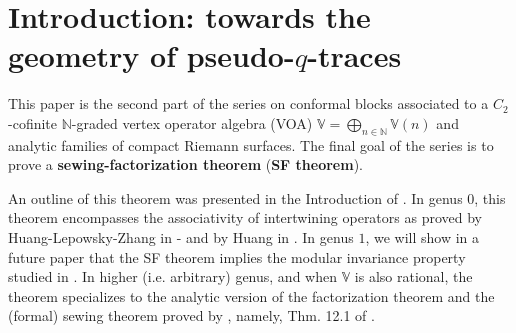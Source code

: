 \documentclass[11pt,b5paper,notitlepage]{article}
\theoremstyle{definition}
\theoremstyle{plain}
\newcommand{\Vbb}{\mathbb V}
\newcommand{\Nbb}{\mathbb N}
\newcommand{\<}{\left\langle}
\renewcommand{\>}{\right\rangle}
\numberwithin{equation}{section}
\begin{document}



	
	
	
	

	
	

	
	
	
	
	
	
	
	
	



\section{Introduction: towards the geometry of pseudo-$q$-traces}

\nocite{HLZ1,HLZ2,HLZ3,HLZ4,HLZ5,HLZ6,HLZ7,HLZ8}



This paper is the second part of the series on conformal blocks associated to a $C_2$-cofinite $\Nbb$-graded vertex operator algebra (VOA) $\Vbb=\bigoplus_{n\in\Nbb}\Vbb(n)$ and analytic families of compact Riemann surfaces. The final goal of the series is to prove a \textbf{sewing-factorization theorem} (\textbf{SF theorem}). 

An outline of this theorem was presented in the Introduction of \cite{GZ1}. In genus $0$, this theorem encompasses the associativity of intertwining operators as proved by Huang-Lepowsky-Zhang in \cite{HLZ1,HLZ2}-\cite{HLZ8} and by Huang in \cite{Hua-projectivecover}. In genus $1$, we will show in a future paper that the SF theorem implies the modular invariance property studied in \cite{Zhu-modular-invariance,Miy-modular-invariance,Hua-differential-genus-1,AN-pseudo-trace,Hua-modular-C2}. In higher (i.e. arbitrary) genus, and when $\Vbb$ is also rational, the theorem specializes to the analytic version of the factorization theorem and the (formal) sewing theorem proved by \cite{DGT2}, namely, Thm. 12.1 of \cite{Gui-sewingconvergence}. 
\end{document}

